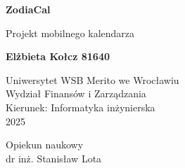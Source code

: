 \begin{titlepage}
    \begin{center}
        \vspace*{1cm}
        
        \Huge
        \textbf{ZodiaCal}
        
        \vspace{0.5cm}
        \LARGE
        Projekt mobilnego kalendarza

        \vspace{5cm}

        
        \textbf{Elżbieta Kołcz 81640}


        \vspace{0.5cm}

        \Large
        Uniwersytet WSB Merito we Wrocławiu\\
        Wydział Finansów i Zarządzania\\
        Kierunek: Informatyka inżynierska\\
        2025
        
        \vfill
        Opiekun naukowy\\
        dr inż. Stanisław Lota

        
        \vspace{0.8cm}
    \end{center}
\end{titlepage}
